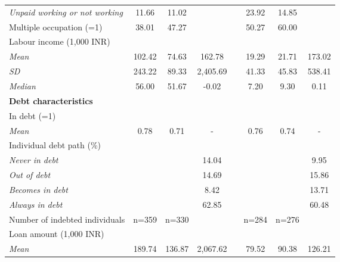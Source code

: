 \begin{table}[htbp]
{\begin{tabular}{lccccccc}
    \hspace*{0.1cm} \textit{Unpaid working or not working} & 11.66 & 11.02 &       &       & 23.92 & 14.85 &  \\
    Multiple occupation (=1) & 38.01 & 47.27 &       &       & 50.27 & 60.00 &  \\
    Labour income (1,000 INR) &       &       &       &       &       &       &  \\
    \hspace*{0.1cm} \textit{Mean} & 102.42 & 74.63 & 162.78 &       & 19.29 & 21.71 & 173.02 \\
    \hspace*{0.1cm} \textit{SD} & 243.22 & 89.33 & 2,405.69 &       & 41.33 & 45.83 & 538.41 \\
    \hspace*{0.1cm} \textit{Median} & 56.00 & 51.67 & -0.02 &       & 7.20  & 9.30  & 0.11 \\
    \textbf{Debt characteristics} &       &       &       &       &       &       &  \\
    In debt (=1) &       &       &       &       &       &       &  \\
    \hspace*{0.1cm} \textit{Mean} & 0.78  & 0.71  & -     &       & 0.76  & 0.74  & - \\
    Individual debt path (\%) &       &       &       &       &       &       &  \\
    \hspace*{0.1cm} \textit{Never in debt} &       &       & 14.04 &       &       &       & 9.95 \\
    \hspace*{0.1cm} \textit{Out of debt} &       &       & 14.69 &       &       &       & 15.86 \\
    \hspace*{0.1cm} \textit{Becomes in debt} &       &       & 8.42  &       &       &       & 13.71 \\
    \hspace*{0.1cm} \textit{Always in debt} &       &       & 62.85 &       &       &       & 60.48 \\
    Number of indebted individuals & n=359 & n=330 &       &       & n=284 & n=276 &  \\
    Loan amount (1,000 INR) &       &       &       &       &       &       &  \\
    \hspace*{0.1cm} \textit{Mean} & 189.74 & 136.87 & 2,067.62 &       & 79.52 & 90.38 & 126.21 \\

\end{tabular}}
\end{table}
